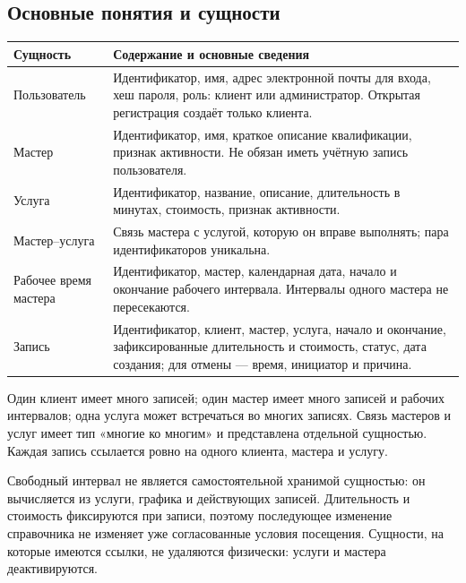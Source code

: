 \subsection{Основные понятия и сущности}
\begin{longtable}{L{3.3cm}L{11.5cm}}
\toprule Сущность & Содержание и основные сведения \\ \midrule
\endhead
Пользователь & Идентификатор, имя, адрес электронной почты для входа, хеш пароля, роль: клиент или администратор. Открытая регистрация создаёт только клиента. \\
Мастер & Идентификатор, имя, краткое описание квалификации, признак активности. Не обязан иметь учётную запись пользователя. \\
Услуга & Идентификатор, название, описание, длительность в минутах, стоимость, признак активности. \\
Мастер--услуга & Связь мастера с услугой, которую он вправе выполнять; пара идентификаторов уникальна. \\
Рабочее время мастера & Идентификатор, мастер, календарная дата, начало и окончание рабочего интервала. Интервалы одного мастера не пересекаются. \\
Запись & Идентификатор, клиент, мастер, услуга, начало и окончание, зафиксированные длительность и стоимость, статус, дата создания; для отмены --- время, инициатор и причина. \\
\bottomrule
\end{longtable}
Один клиент имеет много записей; один мастер имеет много записей и рабочих интервалов; одна услуга может встречаться во многих записях. Связь мастеров и услуг имеет тип «многие ко многим» и представлена отдельной сущностью. Каждая запись ссылается ровно на одного клиента, мастера и услугу.

Свободный интервал не является самостоятельной хранимой сущностью: он вычисляется из услуги, графика и действующих записей. Длительность и стоимость фиксируются при записи, поэтому последующее изменение справочника не изменяет уже согласованные условия посещения. Сущности, на которые имеются ссылки, не удаляются физически: услуги и мастера деактивируются.

